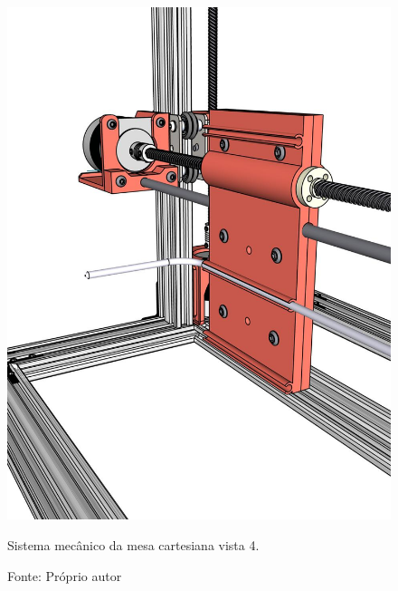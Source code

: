 \begin{figure}[H]
\centering
\includegraphics[scale = 0.45]{figuras/mesacartesiana04}
\caption{Sistema mecânico da mesa cartesiana vista 4.}
\caption*{Fonte: Próprio autor}
\label{fig:mesacartesiana04}
\end{figure}

